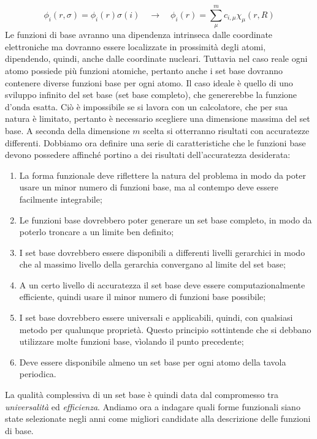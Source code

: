 \documentclass[oneside]{amsbook}
\numberwithin{section}{chapter}
\numberwithin{equation}{section}
\numberwithin{figure}{section}
\begin{document}
\begin{equation}
\phi_i(r,\sigma)= \phi_i(r)\sigma (i) \quad \rightarrow \quad \phi_i(r)= \sum \limits _{\mu} ^m c_{i,\mu} \chi_\mu (r,R)
\end{equation}
Le funzioni di base avranno una dipendenza intrinseca dalle coordinate elettroniche ma dovranno essere localizzate in prossimità degli atomi, dipendendo, quindi, anche dalle coordinate nucleari. Tuttavia nel caso reale ogni atomo possiede più funzioni atomiche, pertanto anche i set base dovranno contenere diverse funzioni base per ogni atomo. Il caso ideale è quello di uno sviluppo infinito del set base (set base completo), che genererebbe la funzione d'onda esatta. Ciò è impossibile se si lavora con un calcolatore, che per sua natura è limitato, pertanto è necessario scegliere una dimensione massima del set base. A seconda della dimensione $m$ scelta si otterranno risultati con accuratezze differenti.
Dobbiamo ora definire una serie di caratteristiche che le funzioni base devono possedere affinché portino a dei risultati dell'accuratezza desiderata:
\begin{enumerate}
\item La forma funzionale deve riflettere la natura del problema in modo da poter usare un minor numero di funzioni base, ma al contempo deve essere facilmente integrabile;
\item Le funzioni base dovrebbero poter generare un set base completo, in modo da poterlo troncare a un limite ben definito;
\item I set base dovrebbero essere disponibili a differenti livelli gerarchici in modo che al massimo livello della gerarchia  convergano al limite del set base;
\item A un certo livello di accuratezza il set base deve essere computazionalmente efficiente, quindi usare il minor numero di funzioni base possibile;
\item I set base dovrebbero essere universali e applicabili, quindi, con qualsiasi metodo per qualunque proprietà. Questo principio sottintende che si debbano utilizzare molte funzioni base, vìolando il punto precedente;
\item Deve essere disponibile almeno un set base per ogni atomo della tavola periodica.
\end{enumerate}
La qualità complessiva di un set base è quindi data dal compromesso tra \emph{universalità} ed \emph{efficienza}. Andiamo ora a indagare quali forme funzionali siano state selezionate negli anni come migliori candidate alla descrizione delle funzioni di base.
\end{document}
